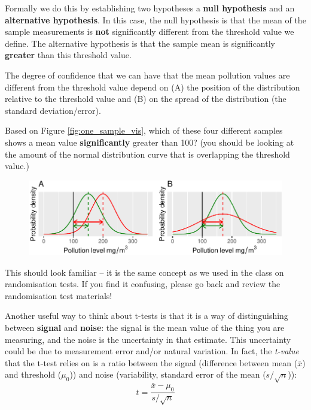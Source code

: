 \documentclass[
  a4paperpaper,
]{book}
\begin{document}
Formally we do this by establishing two hypotheses a \textbf{null hypothesis} and an \textbf{alternative hypothesis}. In this case, the null hypothesis is that the mean of the sample measurements is \textbf{not} significantly different from the threshold value we define. The alternative hypothesis is that the sample mean is significantly \textbf{greater} than this threshold value.

The degree of confidence that we can have that the mean pollution values are different from the threshold value depend on (A) the position of the distribution relative to the threshold value and (B) on the spread of the distribution (the standard deviation/error).

Based on Figure \ref{fig:one_sample_vis}, which of these four different samples shows a mean value \textbf{significantly} greater than 100? (you should be looking at the amount of the normal distribution curve that is overlapping the threshold value.)

\begin{figure}

{\centering \includegraphics{BB852_files/figure-latex/one_sample_vis-1} 

}

\end{figure}

This should look familiar -- it is the same concept as we used in the class on randomisation tests. If you find it confusing, please go back and review the randomisation test materials!

Another useful way to think about t-tests is that it is a way of distinguishing between \textbf{signal} and \textbf{noise}: the signal is the mean value of the thing you are measuring, and the noise is the uncertainty in that estimate. This uncertainty could be due to measurement error and/or natural variation. In fact, the \emph{t-value} that the t-test relies on is a ratio between the signal (difference between mean (\(\bar{x}\)) and threshold (\(\mu_{0}\))) and noise (variability, standard error of the mean (\(s/ \sqrt{n}\))): \[t = \frac{\bar{x}-\mu_{0}} {s/ \sqrt{n}}\]
\end{document}

